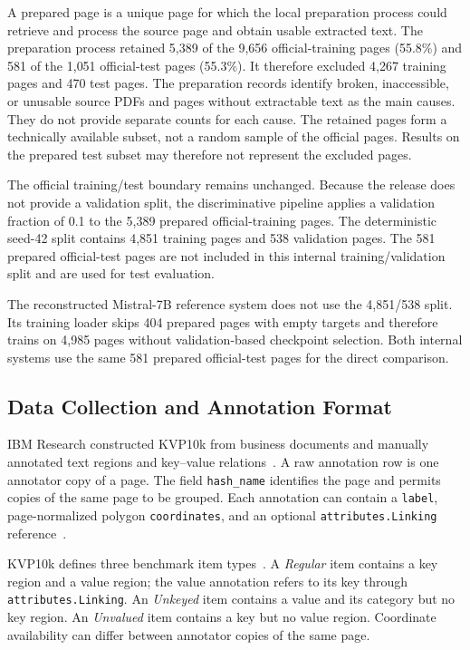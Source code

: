 A prepared page is a unique page for which the local preparation process
could retrieve and process the source page and obtain usable extracted text.
The preparation process retained 5{,}389 of the 9{,}656 official-training
pages (55.8\%) and 581 of the 1{,}051 official-test pages (55.3\%). It
therefore excluded 4{,}267 training pages and 470 test pages. The preparation
records identify broken, inaccessible, or unusable source PDFs and pages
without extractable text as the main causes. They do not provide separate
counts for each cause. The retained pages form a technically available subset,
not a random sample of the official pages. Results on the prepared test subset
may therefore not represent the excluded pages.

The official training/test boundary remains unchanged. Because the release
does not provide a validation split, the discriminative pipeline applies a
validation fraction of 0.1 to the 5{,}389 prepared official-training pages.
The deterministic seed-42 split contains 4{,}851 training pages and 538
validation pages. The 581 prepared official-test pages are not included in
this internal training/validation split and are used for test evaluation.

The reconstructed Mistral-7B reference system does not use the
4{,}851/538 split. Its training loader skips 404 prepared pages with empty
targets and therefore trains on 4{,}985 pages without validation-based
checkpoint selection. Both internal systems use the same 581 prepared
official-test pages for the direct comparison.

\subsection{Data Collection and Annotation Format}

IBM Research constructed KVP10k from business documents and manually
annotated text regions and key--value relations~\cite{kvp10k}. A raw
annotation row is one annotator copy of a page. The field
\texttt{hash\_name} identifies the page and permits copies of the same page
to be grouped. Each annotation can contain a \texttt{label}, page-normalized
polygon \texttt{coordinates}, and an optional
\texttt{attributes.Linking} reference~\cite{kvp10k_repository}.

KVP10k defines three benchmark item types~\cite{kvp10k}. A
\emph{Regular} item contains a key region and a value region; the value
annotation refers to its key through \texttt{attributes.Linking}. An
\emph{Unkeyed} item contains a value and its category but no key region. An
\emph{Unvalued} item contains a key but no value region. Coordinate
availability can differ between annotator copies of the same page.

